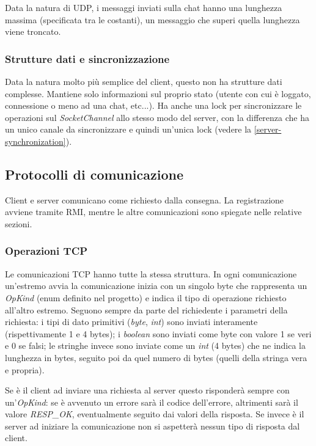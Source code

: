 \documentclass[a4paper]{article}
\theoremstyle{theorem}
\theoremstyle{remark}
\theoremstyle{definition}
\theoremstyle{corollary}
\theoremstyle{lemma}
\begin{document}
Data la natura di UDP, i messaggi inviati sulla chat hanno una lunghezza massima (specificata tra le costanti), un messaggio che superi quella lunghezza viene troncato.

\subsubsection{Strutture dati e sincronizzazione}
Data la natura molto più semplice del client, questo non ha strutture dati complesse. Mantiene solo informazioni sul proprio stato (utente con cui è loggato, connessione o meno ad una chat, etc...). Ha anche una lock per sincronizzare le operazioni sul \textit{SocketChannel} allo stesso modo del server, con la differenza che ha un unico canale da sincronizzare e quindi un'unica lock (vedere la \autoref{server-synchronization}).


\subsection{Protocolli di comunicazione}\label{comunication-protocols}
Client e server comunicano come richiesto dalla consegna. La registrazione avviene tramite RMI, mentre le altre comunicazioni sono spiegate nelle relative sezioni.

\subsubsection{Operazioni TCP}\label{comunication-tcp}
Le comunicazioni TCP hanno tutte la stessa struttura. In ogni comunicazione un'estremo avvia la comunicazione inizia con un singolo byte che rappresenta un \textit{OpKind} (enum definito nel progetto) e indica il tipo di operazione richiesto all'altro estremo. Seguono sempre da parte del richiedente i parametri della richiesta: i tipi di dato primitivi (\textit{byte}, \textit{int}) sono inviati interamente (rispettivamente 1 e 4 bytes); i \textit{boolean} sono inviati come byte con valore 1 se veri e 0 se falsi; le stringhe invece sono inviate come un \textit{int} (4 bytes) che ne indica la lunghezza in bytes, seguito poi da quel numero di bytes (quelli della stringa vera e propria).

Se è il client ad inviare una richiesta al server questo risponderà sempre con un'\textit{OpKind}: se è avvenuto un errore sarà il codice dell'errore, altrimenti sarà il valore \textit{RESP\_OK}, eventualmente seguito dai valori della risposta. Se invece è il server ad iniziare la comunicazione non si aspetterà nessun tipo di risposta dal client.
\end{document}
